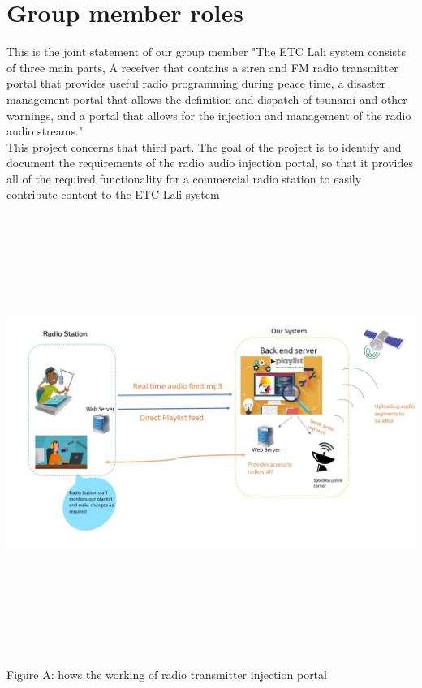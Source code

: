 \section{Group member roles}

This is the joint statement of our group member "The ETC Lali system consists of three main parts, A receiver that contains a siren and FM radio transmitter portal that provides useful radio programming during peace time, a disaster management portal that allows the definition and dispatch of tsunami and other warnings, and a portal that allows for the injection and management of the radio audio streams."\\

This project concerns that third part. The goal of the project is to identify and document the requirements of the radio audio injection portal, so that it provides all of the required functionality for a commercial radio station to easily contribute content to the ETC Lali system\\
\includegraphics[width=15cm,height=15cm,keepaspectratio]{Figures/1.jpg}\\
\caption{Figure A: hows the working of radio transmitter injection portal}

